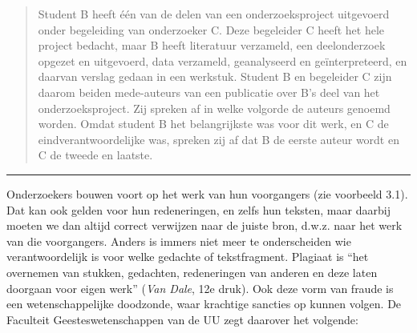 \documentclass[
]{book}
\begin{document}
\begin{quote}
Student B heeft één van de delen van een onderzoeksproject uitgevoerd
onder begeleiding van onderzoeker C. Deze begeleider C heeft het hele
project bedacht, maar B heeft literatuur verzameld, een deelonderzoek
opgezet en uitgevoerd, data verzameld, geanalyseerd en geïnterpreteerd,
en daarvan verslag gedaan in een werkstuk. Student B en begeleider C
zijn daarom beiden mede-auteurs van een publicatie over B's deel van het
onderzoeksproject. Zij spreken af in welke volgorde de auteurs genoemd
worden. Omdat student B het belangrijkste was voor dit werk, en C de
eindverantwoordelijke was, spreken zij af dat B de eerste auteur wordt
en C de tweede en laatste.
\end{quote}

\begin{center}\rule{0.5\linewidth}{0.5pt}\end{center}

Onderzoekers bouwen voort op het werk van hun voorgangers (zie voorbeeld 3.1).
Dat kan ook gelden voor hun
redeneringen, en zelfs hun teksten, maar daarbij moeten we dan altijd
correct verwijzen naar de juiste bron, d.w.z. naar het werk van die
voorgangers. Anders is immers niet meer te onderscheiden wie
verantwoordelijk is voor welke gedachte of tekstfragment. Plagiaat is
``het overnemen van stukken, gedachten, redeneringen van anderen en deze
laten doorgaan voor eigen werk'' (\emph{Van Dale}, 12e druk). Ook deze vorm
van fraude is een wetenschappelijke doodzonde, waar krachtige sancties
op kunnen volgen. De Faculteit Geesteswetenschappen van de UU zegt
daarover het volgende:
\end{document}
